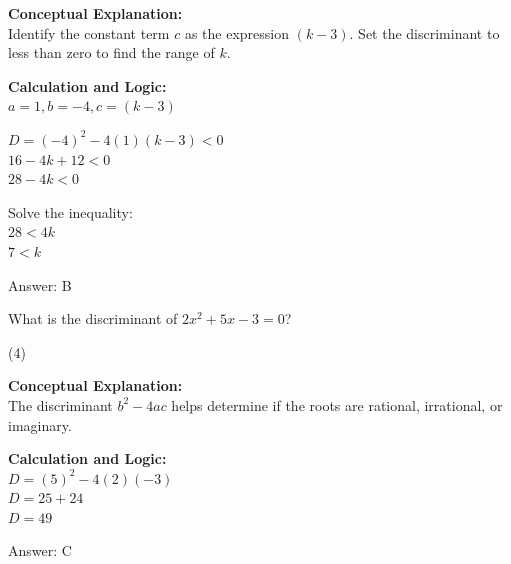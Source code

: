 \documentclass[11pt,paper=a4,answers]{exam}
\begin{document}
\begin{questions}
\begin{solution}
\textbf{Conceptual Explanation:} \\
Identify the constant term $c$ as the expression $(k - 3)$. Set the discriminant to less than zero to find the range of $k$.

\vspace{20pt}

\textbf{Calculation and Logic:} \\
$a = 1, b = -4, c = (k - 3)$

\vspace{10pt}

$D = (-4)^2 - 4(1)(k - 3) < 0$ \\
$16 - 4k + 12 < 0$ \\
$28 - 4k < 0$

\vspace{10pt}

Solve the inequality: \\
$28 < 4k$ \\
$7 < k$

\vspace{25pt}

Answer: \colorbox{yellow!100}{B}
\end{solution}

\vspace{40pt}

\question
What is the discriminant of $2x^2 + 5x - 3 = 0$?
\begin{tasks}(4)
\end{tasks}

\begin{solution}
\textbf{Conceptual Explanation:} \\
The discriminant $b^2 - 4ac$ helps determine if the roots are rational, irrational, or imaginary.

\vspace{20pt}

\textbf{Calculation and Logic:} \\
$D = (5)^2 - 4(2)(-3)$ \\
$D = 25 + 24$ \\
$D = 49$

\vspace{25pt}

Answer: \colorbox{yellow!100}{C}
\end{solution}

\vspace{40pt}


\end{questions}
\end{document}
